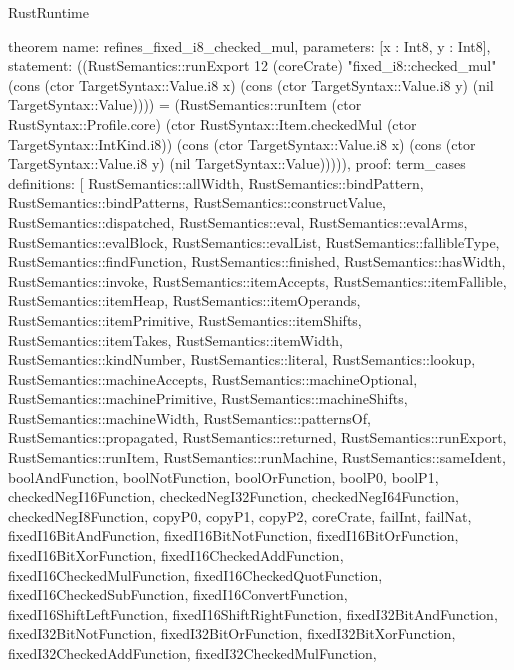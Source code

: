 \begin{lexlean}{RustRuntime}
\begin{semanticmodule}
theorem{
  name: refines_fixed_i8_checked_mul,
  parameters: [x : Int8, y : Int8],
  statement: ((RustSemantics::runExport 12 (coreCrate) "fixed_i8::checked_mul" (cons (ctor TargetSyntax::Value.i8 x) (cons (ctor TargetSyntax::Value.i8 y) (nil TargetSyntax::Value)))) = (RustSemantics::runItem (ctor RustSyntax::Profile.core) (ctor RustSyntax::Item.checkedMul (ctor TargetSyntax::IntKind.i8)) (cons (ctor TargetSyntax::Value.i8 x) (cons (ctor TargetSyntax::Value.i8 y) (nil TargetSyntax::Value))))),
  proof: term_cases{
    definitions: [
      RustSemantics::allWidth,
      RustSemantics::bindPattern,
      RustSemantics::bindPatterns,
      RustSemantics::constructValue,
      RustSemantics::dispatched,
      RustSemantics::eval,
      RustSemantics::evalArms,
      RustSemantics::evalBlock,
      RustSemantics::evalList,
      RustSemantics::fallibleType,
      RustSemantics::findFunction,
      RustSemantics::finished,
      RustSemantics::hasWidth,
      RustSemantics::invoke,
      RustSemantics::itemAccepts,
      RustSemantics::itemFallible,
      RustSemantics::itemHeap,
      RustSemantics::itemOperands,
      RustSemantics::itemPrimitive,
      RustSemantics::itemShifts,
      RustSemantics::itemTakes,
      RustSemantics::itemWidth,
      RustSemantics::kindNumber,
      RustSemantics::literal,
      RustSemantics::lookup,
      RustSemantics::machineAccepts,
      RustSemantics::machineOptional,
      RustSemantics::machinePrimitive,
      RustSemantics::machineShifts,
      RustSemantics::machineWidth,
      RustSemantics::patternsOf,
      RustSemantics::propagated,
      RustSemantics::returned,
      RustSemantics::runExport,
      RustSemantics::runItem,
      RustSemantics::runMachine,
      RustSemantics::sameIdent,
      boolAndFunction,
      boolNotFunction,
      boolOrFunction,
      boolP0,
      boolP1,
      checkedNegI16Function,
      checkedNegI32Function,
      checkedNegI64Function,
      checkedNegI8Function,
      copyP0,
      copyP1,
      copyP2,
      coreCrate,
      failInt,
      failNat,
      fixedI16BitAndFunction,
      fixedI16BitNotFunction,
      fixedI16BitOrFunction,
      fixedI16BitXorFunction,
      fixedI16CheckedAddFunction,
      fixedI16CheckedMulFunction,
      fixedI16CheckedQuotFunction,
      fixedI16CheckedSubFunction,
      fixedI16ConvertFunction,
      fixedI16ShiftLeftFunction,
      fixedI16ShiftRightFunction,
      fixedI32BitAndFunction,
      fixedI32BitNotFunction,
      fixedI32BitOrFunction,
      fixedI32BitXorFunction,
      fixedI32CheckedAddFunction,
      fixedI32CheckedMulFunction,
}}
\end{semanticmodule}
\end{lexlean}
